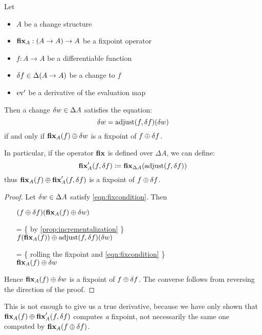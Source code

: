 \begin{thm}
\label{thm:fixpointDiff}
  Let 
  \begin{itemize}
    \item $A$ be a change structure
    \item$\textbf{fix}_A : (A \rightarrow A) \rightarrow A$ be a fixpoint operator
    \item $f: A \rightarrow A$ be a differentiable function
    \item $\delta f \in \Delta (A \rightarrow A)$ be a change to $f$
    \item $\operatorname{ev}'$ be a derivative of the evaluation map
  \end{itemize}

  Then a change $\delta w \in \Delta A$ satisfies
  the equation:
  \begin{equation}\label{eqn:fixcondition}
    \delta w = \operatorname{adjust}(f, \delta f)(\delta w)
  \end{equation}
  if and only if $\textbf{fix}_A(f) \oplus \delta w$ is a fixpoint of $f \oplus \delta f$.
  
  In particular, if the operator $\textbf{fix}$ is defined over $\Delta A$, we can define:
  $$
  \textbf{fix}_A'(f, \delta f) \coloneqq
  \textbf{fix}_{\Delta A}(\operatorname{adjust}(f, \delta f))
  $$
  thus $\textbf{fix}_A(f) \oplus \textbf{fix}_A'(f, \delta f)$ is a fixpoint 
  of $f \oplus \delta f$.
\end{thm}
\begin{proof}
  Let $\delta w \in \Delta A$ satisfy \cref{eqn:fixcondition}. Then
  \begin{itemize}
  \item[ ]
    $
    (f \oplus \delta f)(\textbf{fix}_A(f) \oplus \delta w)
    $
  \item[=]\{ by \cref{prop:incrementalization} \}\\
    $
    f(\textbf{fix}_A(f))
    \oplus
    \operatorname{adjust}(f, \delta f)(\delta w)
    $
  \item[=]\{ rolling the fixpoint and \cref{eqn:fixcondition} \}\\
    $
    \textbf{fix}_A(f)
    \oplus
    \delta w
    $
  \end{itemize}
  Hence $\textbf{fix}_A(f) \oplus \delta w$ is a fixpoint of $f \oplus \delta f$. The converse
  follows from reversing the direction of the proof.
\end{proof}

This is not enough to give us a true derivative, because we have only shown 
that $\textbf{fix}_A(f) \oplus \textbf{fix}_A'(f, \delta f)$ computes \emph{a} fixpoint, not necessarily
the same one computed by $\textbf{fix}_A{(f \oplus \delta f)}$.

